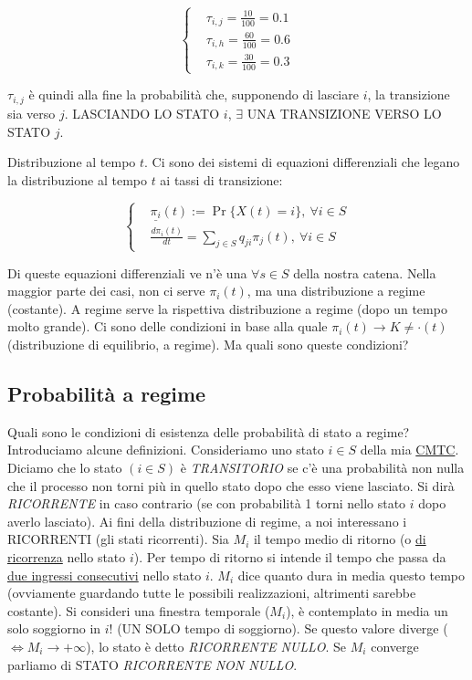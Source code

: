 \[
	\left\{
	\begin{aligned}
	&\tau_{i,j} = \frac{10}{100} = 0.1\\
	&\tau_{i,h} = \frac{60}{100} = 0.6\\
	&\tau_{i,k} = \frac{30}{100} = 0.3
	\end{aligned}
	\right.
\] 

$\tau_{i,j}$ è quindi alla fine la probabilità che, supponendo di lasciare $i$, la transizione sia verso $j$. LASCIANDO LO STATO $i$, $\exists$ UNA TRANSIZIONE VERSO LO STATO $j$.

Distribuzione al tempo $t$. Ci sono dei sistemi di equazioni differenziali che legano la distribuzione al tempo $t$ ai tassi di transizione:

\[	
	\left\{
	\begin{aligned}
	&\underline{\pi_i}(t) := \Pr\{X(t) = i\},\ \forall i\in S\\
	&\frac{d \pi_i(t)}{dt} = \sum_{j\in S}{q_{ji}\pi_j(t)},\ \forall i\in S
	\end{aligned}
	\right.
\]

Di queste equazioni differenziali ve n'è una $\forall s\in S$ della nostra catena. Nella maggior parte dei casi, non ci serve $\pi_i(t)$, ma una distribuzione a regime (costante). A regime serve la rispettiva distribuzione a regime (dopo un tempo molto grande). Ci sono delle condizioni in base alla quale $\pi_i(t) \to K \neq \mathord{\cdot}(t)$ (distribuzione di equilibrio, a regime). Ma quali sono queste condizioni?

\subsection{Probabilità a regime}

Quali sono le condizioni di esistenza delle probabilità di stato a regime? Introduciamo alcune definizioni. Consideriamo uno stato $i \in S$ della mia \underline{CMTC}. Diciamo che lo stato $(i\in S)$ è \textit{TRANSITORIO} se c'è una probabilità non nulla che il processo non torni più in quello stato dopo che esso viene lasciato. Si dirà \textit{RICORRENTE} in caso contrario (se con probabilità 1 torni nello stato $i$ dopo averlo lasciato). Ai fini della distribuzione di regime, a noi interessano i RICORRENTI (gli stati ricorrenti). Sia $M_i$ il tempo medio di ritorno (o \underline{di ricorrenza} nello stato $i$). Per tempo di ritorno si intende il tempo che passa da \underline{due ingressi consecutivi} nello stato $i$. $M_i$ dice quanto dura in media questo tempo (ovviamente guardando tutte le possibili realizzazioni, altrimenti sarebbe costante). Si consideri una finestra temporale ($M_i$), è contemplato in media un solo soggiorno in $i$! (UN SOLO tempo di soggiorno). Se questo valore diverge ($\iff M_i \to +\infty$), lo stato è detto \textit{RICORRENTE NULLO}. Se $M_i$ converge parliamo di STATO \textit{RICORRENTE NON NULLO}.

